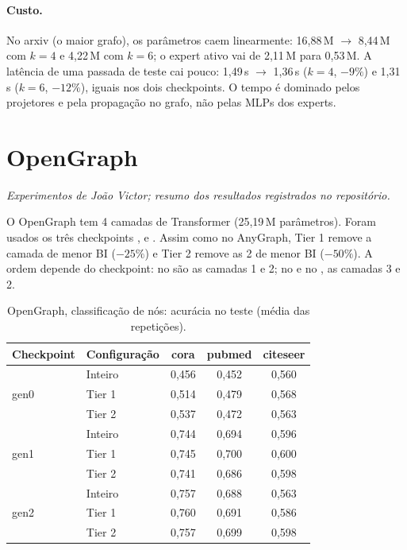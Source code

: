 \documentclass[12pt,a4paper]{article}
\begin{document}
\paragraph{Custo.} No arxiv (o maior grafo), os parâmetros caem linearmente: 16,88\,M $\to$ 8,44\,M com $k=4$ e 4,22\,M com $k=6$; o expert ativo vai de 2,11\,M para 0,53\,M. A latência de uma passada de teste cai pouco: 1,49\,s $\to$ 1,36\,s ($k=4$, $-9\%$) e 1,31\,s ($k=6$, $-12\%$), iguais nos dois checkpoints. O tempo é dominado pelos projetores e pela propagação no grafo, não pelas MLPs dos experts.

\section{OpenGraph}

\emph{Experimentos de João Victor; resumo dos resultados registrados no repositório.}

O OpenGraph tem 4 camadas de Transformer (25,19\,M parâmetros). Foram usados os três checkpoints ,  e . Assim como no AnyGraph, Tier 1 remove a camada de menor BI ($-25\%$) e Tier 2 remove as 2 de menor BI ($-50\%$). A ordem depende do checkpoint: no  são as camadas 1 e 2; no  e no , as camadas 3 e 2.

\begin{table}[H]
\centering
\caption{OpenGraph, classificação de nós: acurácia no teste (média das repetições).}
\label{tab:og-nos}
\begin{tabular}{@{}llccc@{}}
\toprule
Checkpoint & Configuração & cora & pubmed & citeseer \\
\midrule
\multirow{3}{*}{gen0} & Inteiro & 0,456 & 0,452 & 0,560 \\
 & Tier 1 & 0,514 & 0,479 & 0,568 \\
 & Tier 2 & 0,537 & 0,472 & 0,563 \\
\midrule
\multirow{3}{*}{gen1} & Inteiro & 0,744 & 0,694 & 0,596 \\
 & Tier 1 & 0,745 & 0,700 & 0,600 \\
 & Tier 2 & 0,741 & 0,686 & 0,598 \\
\midrule
\multirow{3}{*}{gen2} & Inteiro & 0,757 & 0,688 & 0,563 \\
 & Tier 1 & 0,760 & 0,691 & 0,586 \\
 & Tier 2 & 0,757 & 0,699 & 0,598 \\
\bottomrule
\end{tabular}
\end{table}
\end{document}
